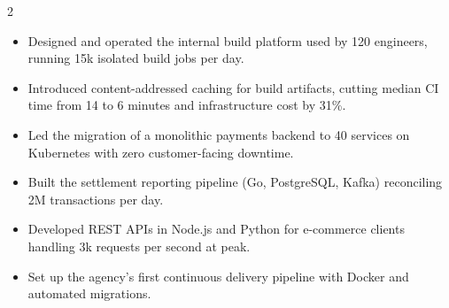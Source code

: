 \documentclass[10pt,a4paper,withhyper]{altacv}
\begin{document}


\makecvheader


\begin{paracol}{2}


\begin{itemize}
\item Designed and operated the internal build platform used by 120 engineers, running 15k isolated build jobs per day.
\item Introduced content-addressed caching for build artifacts, cutting median CI time from 14 to 6 minutes and infrastructure cost by 31\%.
\end{itemize}

\divider

\begin{itemize}
\item Led the migration of a monolithic payments backend to 40 services on Kubernetes with zero customer-facing downtime.
\item Built the settlement reporting pipeline (Go, PostgreSQL, Kafka) reconciling 2M transactions per day.
\end{itemize}

\divider

\begin{itemize}
\item Developed REST APIs in Node.js and Python for e-commerce clients handling 3k requests per second at peak.
\item Set up the agency's first continuous delivery pipeline with Docker and automated migrations.
\end{itemize}



\end{paracol}
\end{document}
